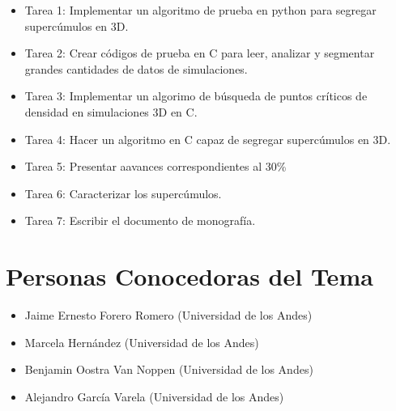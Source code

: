 \documentclass[12pt]{article}
\begin{document}
\begin{itemize}
	\item Tarea 1: Implementar un algoritmo de prueba en python para segregar  supercúmulos en 3D.
	\item Tarea 2: Crear códigos de prueba en C para leer, analizar y segmentar grandes cantidades de datos de simulaciones.
    
	\item Tarea 3: Implementar un algorimo de búsqueda de puntos críticos de densidad en simulaciones 3D en C.
	\item Tarea 4: Hacer un algoritmo en C capaz de segregar supercúmulos en 3D.
    \item Tarea 5: Presentar aavances correspondientes al 30\%
    \item Tarea 6: Caracterizar los supercúmulos.
    \item Tarea 7: Escribir el documento de monografía.
    
    
\end{itemize}

\section{Personas Conocedoras del Tema}


\begin{itemize}
	\item Jaime Ernesto Forero Romero (Universidad de los Andes)
    \item Marcela Hern\'andez (Universidad de los Andes)
	\item Benjamin Oostra Van Noppen (Universidad de los Andes)
	\item Alejandro García Varela (Universidad de los Andes)
\end{itemize}
\end{document}
